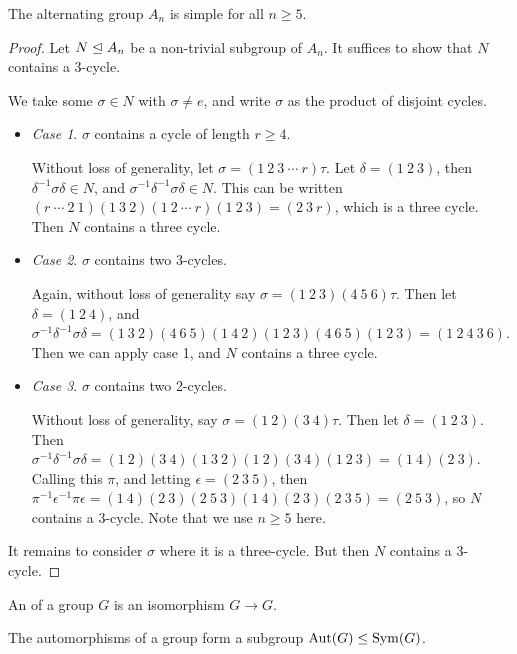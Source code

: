 \documentclass[a4paper]{scrartcl}
\begin{document}
\begin{theorem}[$A_n$ is Simple]
The alternating group $A_n$ is simple for all $n \geq 5$.
\end{theorem}
\begin{proof}
	Let $N \trianglelefteq A_n$ be a non-trivial subgroup of $A_n$. It suffices to show that $N$ contains a $3$-cycle.
	
	We take some $\sigma \in N$ with $\sigma \neq e$, and write $\sigma$ as the product of disjoint cycles.

	\begin{itemize}
		\item \emph{Case 1}. $\sigma$ contains a cycle of length $r \geq 4$.
	
		Without loss of generality, let $\sigma = (1\ 2\ 3\ \cdots\ r)\tau$. Let $\delta = (1\ 2\ 3)$, then $\delta^{-1} \sigma \delta \in N$, and $\sigma^{-1}\delta^{-1} \sigma \delta \in N$. This can be written $(r\ \cdots\ 2\ 1)(1\ 3\ 2)(1\ 2\ \cdots\ r)(1\ 2\ 3) = (2\ 3\ r)$, which is a three cycle. Then $N$ contains a three cycle.

		\item \emph{Case 2}. $\sigma$ contains two 3-cycles.
		
		Again, without loss of generality say $\sigma = (1\ 2\ 3)(4\ 5\ 6)\tau$. Then let $\delta = (1\ 2\ 4)$, and $\sigma^{-1}\delta^{-1}\sigma \delta = (1\ 3\ 2)(4\ 6\ 5) (1\ 4\ 2)(1\ 2\ 3)(4\ 6\ 5)(1\ 2\ 3) = (1\ 2\ 4\ 3\ 6)$. Then we can apply case 1, and $N$ contains a three cycle.
		\item \emph{Case 3}. $\sigma$ contains two 2-cycles.
		
		Without loss of generality, say $\sigma = (1\ 2)(3\ 4) \tau$. Then let $\delta = (1\ 2\ 3)$. Then $\sigma^{-1}\delta^{-1} \sigma \delta = (1\ 2)(3\ 4)(1\ 3\ 2)(1\ 2)(3\ 4)(1\ 2\ 3) = (1\ 4)(2\ 3)$. Calling this $\pi$, and letting $\epsilon = (2\ 3\ 5)$, then $\pi^{-1} \epsilon^{-1} \pi \epsilon = (1\ 4)(2\ 3)(2\ 5\ 3)(1\ 4)(2\ 3)(2\ 3\ 5) = (2\ 5\ 3)$, so $N$ contains a $3$-cycle. Note that we use $n \geq 5$ here. 
	\end{itemize}
	It remains to consider $\sigma$ where it is a three-cycle. But then $N$ contains a 3-cycle.
\end{proof}

\begin{definition}[Automorphism]
	An  of a group $G$ is an isomorphism $G \rightarrow G$.
\end{definition}

The automorphisms of a group form a subgroup $\operatorname{Aut}(G) \leq \operatorname{Sym}(G)$.
\end{document}
